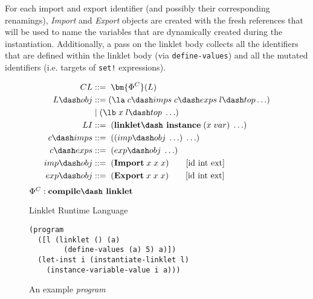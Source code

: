 For each import and export identifier (and possibly their
corresponding renamings), \textit{Import} and \textit{Export} objects
are created with the fresh references that will be used to name the
variables that are dynamically created during the
instantiation. Additionally, a pass on the linklet body collects all
the identifiers that are defined within the linklet body (via
\verb|define-values|) and all the mutated identifiers (i.e. targets of
\verb|set!| expressions).

\begin{figure}[h!]
  \begin{mdframed}
    \begin{align*}
      CL             &::=\; \bm{\Phi^C}(L)\\
      L\dash obj     &::= (\la\; c\dash imps \; c\dash exps \; l\dash top \ldots)\\
      \;           &\;|\; (\lb\; x\; l\dash top\; \ldots) \\
      LI             &::=\; (\textbf{linklet\dash instance}\; (x\; var)\; \ldots) \\
      c\dash imps    &::=\; ((imp\dash obj\; \ldots)\; \ldots)\\
      c\dash exps    &::=\; (exp\dash obj\; \ldots)\\
      imp\dash obj   &::=\; (\textbf{Import}\; x\; x\; x) \tag*{[id int ext]} \\
      exp\dash obj   &::=\; (\textbf{Export}\; x\; x\; x) \tag*{[id int ext]} \\
    \end{align*}
    \hfill \footnotesize $\Phi^C : \textbf{compile\dash linklet}$
    \caption{Linklet Runtime Language}
    \label{fig:linklet-runtime}
  \end{mdframed}
\end{figure}

\begin{figure}[h]
  \begin{mdframed}
\begin{verbatim}
(program
  ([l (linklet () (a)
        (define-values (a) 5) a)])
  (let-inst i (instantiate-linklet l)
    (instance-variable-value i a)))
\end{verbatim}
\caption{An example \textit{program}}
\label{fig:program-example}
  \end{mdframed}
\end{figure}

